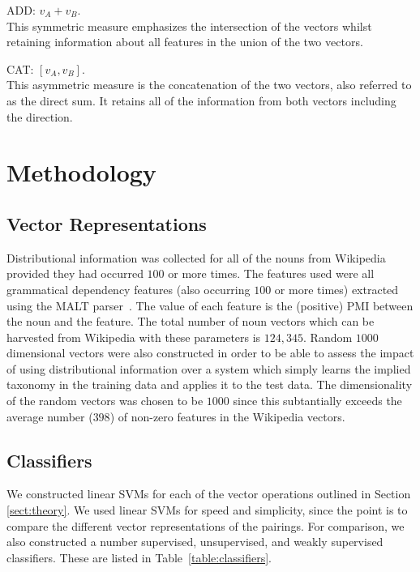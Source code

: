 \documentclass[11pt]{article}
\begin{document}
\noindent ADD: $v_A + v_B$.  \\[2pt]
This symmetric measure emphasizes the intersection of the  vectors whilst retaining information about all features in the union of the two vectors.  

\smallskip

\noindent CAT: $[v_A,v_B]$.\\[2pt]
This asymmetric measure is the concatenation of the two vectors, also referred to as the direct sum.  It retains all of the information from both vectors including the direction.

\section{Methodology}

\subsection{Vector Representations}

Distributional information was collected for all of the nouns from Wikipedia provided they had occurred $100$ or more times.  The features used were all grammatical dependency features (also occurring $100$ or more times) extracted using the MALT parser~\cite{Nivre2006}.  The value of each feature is the (positive) PMI between the noun and the feature. The total number of noun vectors which can be harvested from Wikipedia with these parameters is $124,345$.  Random $1000$ dimensional vectors were also constructed in order to be able to assess the impact of using distributional information over a system which simply learns the implied taxonomy in the training data and applies it to the test data.  The dimensionality of the random vectors was chosen to be $1000$ since this subtantially exceeds the average number ($398$) of non-zero features in the Wikipedia vectors.

\subsection{Classifiers}

We constructed linear SVMs for each of the vector operations outlined in Section \ref{sect:theory}.  We used linear SVMs for speed and simplicity, since the point is to compare the different vector representations of the pairings.  For comparison, we also constructed a number supervised, unsupervised, and  weakly supervised classifiers. These are listed in Table~\ref{table:classifiers}.  
\end{document}
